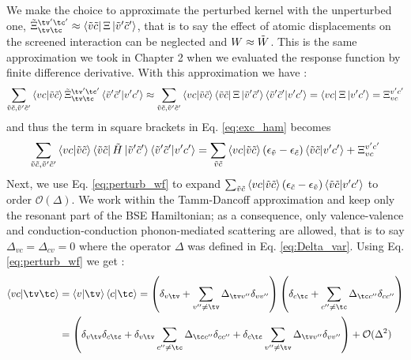 We make the choice to approximate the perturbed kernel with the unperturbed one, $\tilde{\Xi}_{\tv\tc}^{\tv'\tc'} \approx \bra{\Tilde{v}\Tilde{c}} \Xi \ket{\Tilde{v}'\Tilde{c}'}$, that is to say the effect of atomic displacements on the screened interaction can be neglected and $W \approx \Tilde{W}$. This is the same approximation we took in Chapter 2 when we evaluated the response function by finite difference derivative. With this approximation we have :
\begin{equation}
    \sum_{\Tilde{v}\Tilde{c},\Tilde{v}'\Tilde{c}'} \bra{vc}\ket{\Tilde{v}\Tilde{c}} \tilde{\Xi}_{\tv\tc}^{\tv'\tc'} \bra{\Tilde{v}'\Tilde{c}'}\ket{v'c'} 
    \approx  \sum_{\Tilde{v}\Tilde{c},\Tilde{v}'\Tilde{c}'} \bra{vc}\ket{\Tilde{v}\Tilde{c}} 
    \bra{\Tilde{v}\Tilde{c}} \Xi \ket{\Tilde{v}'\Tilde{c}'}\bra{\Tilde{v}'\Tilde{c}'}\ket{v'c'} = \bra{vc} \Xi \ket{v'c'} = \Xi_{vc}^{v'c'}
\end{equation}
and thus the term in square brackets in Eq. \eqref{eq:exc_ham} becomes 
\begin{equation}
    \sum_{\Tilde{v}\Tilde{c},\Tilde{v}'\Tilde{c}'} \bra{vc}\ket{\Tilde{v}\Tilde{c}}  \bra{\Tilde{v}\Tilde{c}} \Tilde{H} \ket{\Tilde{v}'\Tilde{c}'} \bra{\Tilde{v}'\Tilde{c}'}\ket{v'c'} = \sum_{\Tilde{v}\Tilde{c}} \bra{vc}\ket{\Tilde{v}\Tilde{c}} (\epsilon_{\Tilde{v}} - \epsilon_{\Tilde{c}}) \bra{\Tilde{v}\Tilde{c}}\ket{v'c'} +  \Xi_{vc}^{v'c'} 
\end{equation}
Next, we use Eq. \eqref{eq:perturb_wf} to expand $\sum_{\Tilde{v}\tilde{c}} \bra{vc}\ket{\Tilde{v}\Tilde{c}} (\epsilon_{\Tilde{c}} - \epsilon_{\Tilde{v}})\bra{\Tilde{v}\Tilde{c}}\ket{v'c'}$ to order $\mathcal{O}(\Delta)$. We work within the Tamm-Dancoff approximation and keep only the resonant part of the BSE Hamiltonian; as a consequence, only valence-valence and conduction-conduction phonon-mediated scattering are allowed, that is to say $\Delta_{vc} = \Delta_{cv} = 0$ where the operator $\Delta$ was defined in Eq. \eqref{eq:Delta_var}. Using Eq. \eqref{eq:perturb_wf} we get :
\begin{align}
\begin{split}
    \bra{vc}\ket{\tv\tc} &= \bra{v}\ket{\tv}\bra{c}\ket{\tc} = \left(\delta_{v\tv} + \sum_{v''\neq\tv}\Delta_{\tv v''}\delta_{vv''}\right) \left(\delta_{c\tc} + \sum_{c''\neq \tc}\Delta_{\tc c''}\delta_{cc''}\right) \\
    &= \left( \delta_{v\tv}\delta_{c\tc} + \delta_{v\tv} \sum_{c''\neq\tc} \Delta_{\tc c''}\delta_{cc''} + \delta_{c\tc}\sum_{v''\neq \tv} \Delta_{\tv v''} \delta_{vv''} \right) + \mathcal{O}(\Delta^2)
\end{split}
\end{align}
